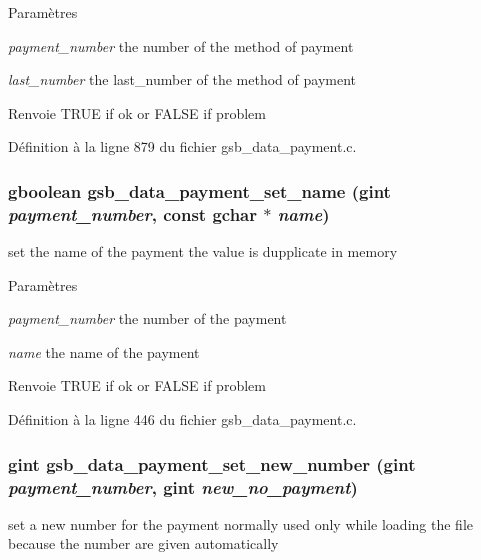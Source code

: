 \begin{DoxyParams}{Paramètres}
\item[{\em payment\_\-number}]the number of the method of payment \item[{\em last\_\-number}]the last\_\-number of the method of payment\end{DoxyParams}
\begin{DoxyReturn}{Renvoie}
TRUE if ok or FALSE if problem 
\end{DoxyReturn}


Définition à la ligne 879 du fichier gsb\_\-data\_\-payment.c.

\subsubsection[{gsb\_\-data\_\-payment\_\-set\_\-name}]{\setlength{\rightskip}{0pt plus 5cm}gboolean gsb\_\-data\_\-payment\_\-set\_\-name (gint {\em payment\_\-number}, \/  const gchar $\ast$ {\em name})}\label{gsb__data__payment_8h_a3e237dcdba177b752d7b340bdb9ea9a8}
set the name of the payment the value is dupplicate in memory


\begin{DoxyParams}{Paramètres}
\item[{\em payment\_\-number}]the number of the payment \item[{\em name}]the name of the payment\end{DoxyParams}
\begin{DoxyReturn}{Renvoie}
TRUE if ok or FALSE if problem 
\end{DoxyReturn}


Définition à la ligne 446 du fichier gsb\_\-data\_\-payment.c.

\subsubsection[{gsb\_\-data\_\-payment\_\-set\_\-new\_\-number}]{\setlength{\rightskip}{0pt plus 5cm}gint gsb\_\-data\_\-payment\_\-set\_\-new\_\-number (gint {\em payment\_\-number}, \/  gint {\em new\_\-no\_\-payment})}\label{gsb__data__payment_8h_a733c8bde55e9529a1b29a6b7125d6c5b}
set a new number for the payment normally used only while loading the file because the number are given automatically


